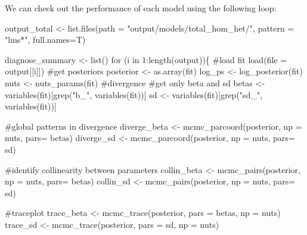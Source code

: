 \documentclass[
  letterpaper,
  DIV=11,
  numbers=noendperiod]{scrreprt}
\newenvironment{Shaded}{}{}
\newcommand{\AttributeTok}[1]{\textcolor[rgb]{0.84,0.23,0.29}{#1}}
\newcommand{\CommentTok}[1]{\textcolor[rgb]{0.42,0.45,0.49}{#1}}
\newcommand{\ControlFlowTok}[1]{\textcolor[rgb]{0.84,0.23,0.29}{#1}}
\newcommand{\DecValTok}[1]{\textcolor[rgb]{0.00,0.36,0.77}{#1}}
\newcommand{\FunctionTok}[1]{\textcolor[rgb]{0.44,0.26,0.76}{#1}}
\newcommand{\NormalTok}[1]{\textcolor[rgb]{0.14,0.16,0.18}{#1}}
\newcommand{\OtherTok}[1]{\textcolor[rgb]{0.44,0.26,0.76}{#1}}
\newcommand{\SpecialCharTok}[1]{\textcolor[rgb]{0.00,0.36,0.77}{#1}}
\newcommand{\StringTok}[1]{\textcolor[rgb]{0.01,0.18,0.38}{#1}}
\begin{document}
We can check out the performance of each model using the following loop:

\begin{Shaded}
\begin{Highlighting}[]
\NormalTok{output\_total }\OtherTok{\textless{}{-}} \FunctionTok{list.files}\NormalTok{(}\AttributeTok{path =} \StringTok{"output/models/total\_hom\_het/"}\NormalTok{,}
                         \AttributeTok{pattern =} \StringTok{"lms*"}\NormalTok{, }\AttributeTok{full.names=}\NormalTok{T)}

\NormalTok{diagnose\_summary }\OtherTok{\textless{}{-}} \FunctionTok{list}\NormalTok{()}
\ControlFlowTok{for}\NormalTok{ (i }\ControlFlowTok{in} \DecValTok{1}\SpecialCharTok{:}\FunctionTok{length}\NormalTok{(output))\{}
  \CommentTok{\#load fit}
  \FunctionTok{load}\NormalTok{(}\AttributeTok{file =}\NormalTok{ output[[i]])}
  \CommentTok{\#get posteriors}
\NormalTok{  posterior }\OtherTok{\textless{}{-}} \FunctionTok{as.array}\NormalTok{(fit)}
\NormalTok{  log\_ps }\OtherTok{\textless{}{-}} \FunctionTok{log\_posterior}\NormalTok{(fit)}
\NormalTok{  nuts }\OtherTok{\textless{}{-}} \FunctionTok{nuts\_params}\NormalTok{(fit) }\CommentTok{\#divergence}
  \CommentTok{\#get only beta and sd}
\NormalTok{  betas }\OtherTok{\textless{}{-}} \FunctionTok{variables}\NormalTok{(fit)[}\FunctionTok{grep}\NormalTok{(}\StringTok{"b\_"}\NormalTok{, }\FunctionTok{variables}\NormalTok{(fit))]}
\NormalTok{  sd }\OtherTok{\textless{}{-}} \FunctionTok{variables}\NormalTok{(fit)[}\FunctionTok{grep}\NormalTok{(}\StringTok{"sd\_"}\NormalTok{, }\FunctionTok{variables}\NormalTok{(fit))]}
  
  \CommentTok{\#global patterns in divergence}
\NormalTok{  diverge\_beta }\OtherTok{\textless{}{-}} \FunctionTok{mcmc\_parcoord}\NormalTok{(posterior, }\AttributeTok{np =}\NormalTok{ nuts, }\AttributeTok{pars=}\NormalTok{ betas)}
\NormalTok{  diverge\_sd }\OtherTok{\textless{}{-}} \FunctionTok{mcmc\_parcoord}\NormalTok{(posterior, }\AttributeTok{np =}\NormalTok{ nuts, }\AttributeTok{pars=}\NormalTok{ sd)}
  
  \CommentTok{\#identify collinearity between parameters}
\NormalTok{  collin\_beta }\OtherTok{\textless{}{-}} \FunctionTok{mcmc\_pairs}\NormalTok{(posterior, }\AttributeTok{np =}\NormalTok{ nuts, }\AttributeTok{pars=}\NormalTok{ betas)}
\NormalTok{  collin\_sd }\OtherTok{\textless{}{-}} \FunctionTok{mcmc\_pairs}\NormalTok{(posterior, }\AttributeTok{np =}\NormalTok{ nuts, }\AttributeTok{pars=}\NormalTok{ sd)}
  
  \CommentTok{\#traceplot}
\NormalTok{  trace\_beta }\OtherTok{\textless{}{-}} \FunctionTok{mcmc\_trace}\NormalTok{(posterior, }\AttributeTok{pars =}\NormalTok{ betas, }\AttributeTok{np =}\NormalTok{ nuts)}
\NormalTok{  trace\_sd }\OtherTok{\textless{}{-}} \FunctionTok{mcmc\_trace}\NormalTok{(posterior, }\AttributeTok{pars =}\NormalTok{ sd, }\AttributeTok{np =}\NormalTok{ nuts)}
  

\end{Highlighting}
\end{Shaded}
\end{document}
